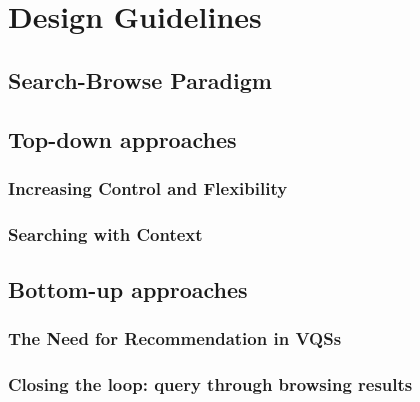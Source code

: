 \section{Design Guidelines\label{sec:guidelines}}

\subsection{Search-Browse Paradigm}

\subsection{Top-down approaches}
  \subsubsection{Increasing Control and Flexibility}
  \subsubsection{Searching with Context}
\subsection{Bottom-up approaches}
  \subsubsection{The Need for Recommendation in VQSs}
  \subsubsection{Closing the loop: query through browsing results}
